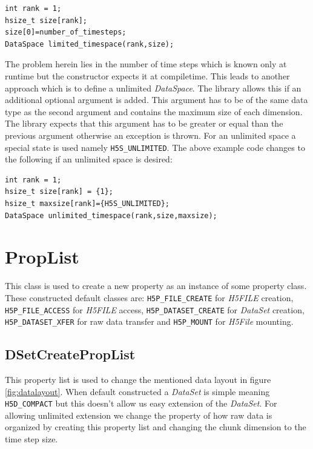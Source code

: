 \begin{lstlisting}
int rank = 1;
hsize_t size[rank];
size[0]=number_of_timesteps;
DataSpace limited_timespace(rank,size);
\end{lstlisting}
The problem herein lies in the number of time steps which is known only at runtime but the constructor expects it at compiletime. This leads to another approach which is to define a unlimited \textit{DataSpace}. The library allows this if an additional optional argument is added. This argument has to be of the same data type as the second argument and contains the maximum size of each dimension. The library expects that this argument has to be greater or equal than the previous argument otherwise an exception is thrown. For an unlimited space a special state is used namely \texttt{H5S\_UNLIMITED}. The above example code changes to the following if an unlimited space is desired:
\begin{lstlisting}
int rank = 1;
hsize_t size[rank] = {1};
hsize_t maxsize[rank]={H5S_UNLIMITED};
DataSpace unlimited_timespace(rank,size,maxsize);
\end{lstlisting}

\section{PropList}
This class is used to create a new property as an instance of some property class. These constructed default classes are: \texttt{H5P\_FILE\_CREATE} for \textit{H5FILE} creation, \texttt{H5P\_FILE\_ACCESS} for \textit{H5FILE} access, \texttt{H5P\_DATASET\_CREATE} for \textit{DataSet} creation, \texttt{H5P\_DATASET\_XFER} for raw data transfer and \texttt{H5P\_MOUNT} for \textit{H5File} mounting.

\subsection{DSetCreatePropList}
This property list is used to change the mentioned data layout in figure \ref{fig:datalayout}. %
When default constructed a \textit{DataSet} is simple meaning \texttt{H5D\_COMPACT} but this doesn't allow us easy extension of the \textit{DataSet}. For allowing unlimited extension we change the property of how raw data is organized by creating this property list and changing the chunk dimension to the time step size.

